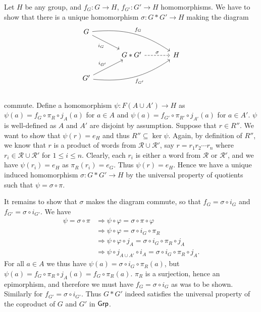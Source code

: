 \begin{solution}
	Let $H$ be any group, and $f_G: G \to H$, $f_{G'}: G' \to H$ homomorphisms. We have to show that there is a unique homomorphism $\sigma: G * G' \to H$ making the diagram
	\begin{equation*}
		\begin{tikzcd}[column sep=large]
			G
			\arrow[dr, "i_G"']
			\arrow[drr, bend left=20, "f_G"]
			& & \\
			& G * G'
			\arrow[r, dashrightarrow, "\sigma"]
			& H \\
			G'
			\arrow[ur, "i_{G'}"]
			\arrow[urr, bend right=20, "f_{G'}"']
			& & \\
		\end{tikzcd}
	\end{equation*}
	commute. Define a homomorphism $\psi: F(A \cup A') \to H$ as $\psi(a) = f_G \circ \pi_R \circ j_A (a)$ for $a \in A$ and $\psi(a) = f_{G'} \circ \pi_{R'} \circ j_{A'} (a)$ for $a \in A'$. $\psi$ is well-defined as $A$ and $A'$ are disjoint by assumption. Suppose that $r \in R''$. We want to show that $\psi(r) = e_H$ and thus $R'' \subseteq \ker \psi$. Again, by definition of $R''$, we know that $r$ is a product of words from $\mathscr{R} \cup \mathscr{R}'$, say $r = r_1 r_2 \cdots r_n$ where $r_i \in \mathscr{R} \cup \mathscr{R}'$ for $1 \leq i \leq n$. Clearly, each $r_i$ is either a word from $\mathscr{R}$ or $\mathscr{R}'$, and we have $\psi(r_i) = e_H$ as $\pi_R(r_i) = e_G$. Thus $\psi(r) = e_H$. Hence we have a unique induced homomorphism $\sigma: G * G' \to H$ by the universal property of quotients such that $\psi = \sigma \circ \pi$.
	
	It remains to show that $\sigma$ makes the diagram commute, so that $f_G = \sigma \circ i_G$ and $f_{G'} = \sigma \circ i_{G'}$. We have
	\begin{equation*}
		\begin{aligned}
			\psi = \sigma \circ \pi &\Longrightarrow \psi \circ \varphi = \sigma \circ \pi \circ \varphi \\
			&\Longrightarrow \psi \circ \varphi = \sigma \circ i_G \circ \pi_R \\
			&\Longrightarrow \psi \circ \varphi \circ j_A = \sigma \circ i_G \circ \pi_R \circ j_A \\
			&\Longrightarrow \psi \circ j_{A \cup A'} \circ i_A = \sigma \circ i_G \circ \pi_R \circ j_A \text{.}
		\end{aligned}
	\end{equation*}
	 For all $a \in A$ we thus have $\psi(a) = \sigma \circ i_G \circ \pi_R(a)$, but $\psi(a) = f_G \circ \pi_R \circ j_A(a) = f_G \circ \pi_R(a)$. $\pi_R$ is a surjection, hence an epimorphism, and therefore we must have $f_G = \sigma \circ i_G$ as was to be shown. Similarly for $f_{G'} = \sigma \circ i_{G'}$. Thus $G * G'$ indeed satisfies the universal property of the coproduct of $G$ and $G'$ in $\mathsf{Grp}$.
\end{solution}

